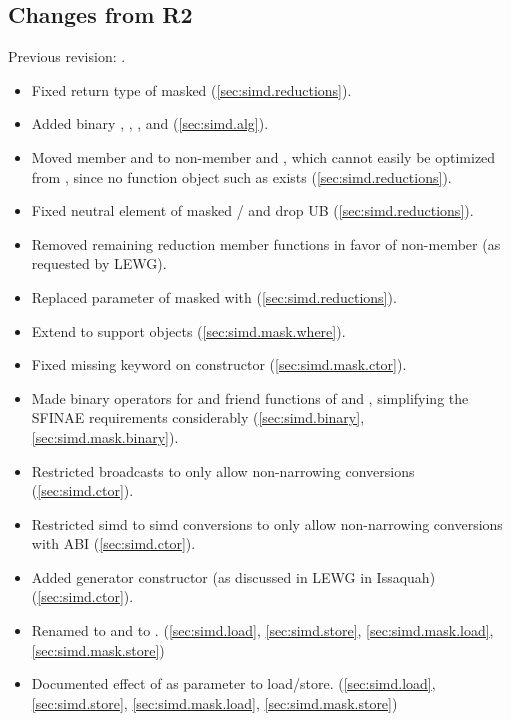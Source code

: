 \subsection{Changes from R2}
Previous revision: \parencite{P0214R2}.
\begin{itemize}
    \item Fixed return type of masked  (\ref{sec:simd.reductions}).
    \item Added binary , , , and  (\ref{sec:simd.alg}).
    \item Moved member  and  to non-member  and , which cannot easily be optimized from , since no function object such as  exists (\ref{sec:simd.reductions}).
    \item Fixed neutral element of masked / and drop UB (\ref{sec:simd.reductions}).
    \item Removed remaining reduction member functions in favor of non-member  (as requested by LEWG).
    \item Replaced  parameter of masked  with  (\ref{sec:simd.reductions}).
    \item Extend  to support \const \simd objects (\ref{sec:simd.mask.where}).
    \item Fixed missing  keyword on  constructor (\ref{sec:simd.mask.ctor}).
    \item Made binary operators for \simd and \mask friend functions of \simd and \mask, simplifying the SFINAE requirements considerably (\ref{sec:simd.binary}, \ref{sec:simd.mask.binary}).
    \item Restricted broadcasts to only allow non-narrowing conversions (\ref{sec:simd.ctor}).
    \item Restricted simd to simd conversions to only allow non-narrowing conversions with  ABI (\ref{sec:simd.ctor}).
    \item Added generator constructor (as discussed in LEWG in Issaquah) (\ref{sec:simd.ctor}).
    \item Renamed  to  and  to . (\ref{sec:simd.load}, \ref{sec:simd.store}, \ref{sec:simd.mask.load}, \ref{sec:simd.mask.store})
    \item Documented effect of  as  parameter to load/store. (\ref{sec:simd.load}, \ref{sec:simd.store}, \ref{sec:simd.mask.load}, \ref{sec:simd.mask.store})

\end{itemize}
